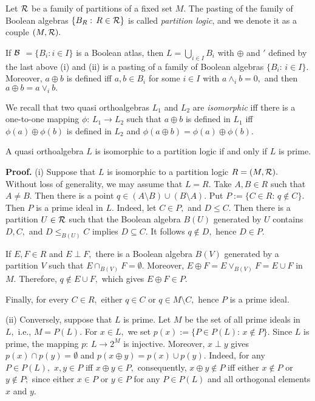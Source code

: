 Let $\cal R$ be a family of partitions of a fixed set  $M.$ The pasting
of the family of Boolean algebras $\{B_R:\, R \in {\cal {R}} \}$ is
called  {\it partition logic}, and we denote it as a couple
$(M, {\cal{R}}).$

\begin{remark} If $\cal {B}$ $ = \{B_i: i \in I\}$ is a Boolean atlas,
then $L = \bigcup_{i \in I} B_i$ with $\oplus$ and $'$ defined by
the last above {\rm (i)} and {\rm (ii)} is a pasting of a family of
Boolean algebras $\{B_i:\, i \in I\}.$
Moreover, $a \oplus b$ is defined iff $a,b \in B_i$ for some $i \in I$
with $a \wedge_i b = 0,$ and then $ a\oplus b = a \vee_i b.$
\end{remark}

We %
 recall that two quasi orthoalgebras $L_1$  and $L_2$ are {\it
isomorphic}
iff there is a one-to-one mapping $\phi:\, L_1 \to L_2$ such that
$a\oplus  b$ is defined in $L_1 $ iff $\phi(a) \oplus \phi(b)$ is
defined in $L_2$ and $\phi(a\oplus b) =\phi(a) \oplus \phi(b).$


\begin{theorem}\label{th5.2} A quasi orthoalgebra $L$ is
isomorphic to a partition logic if and only if $L$ is prime.
\end{theorem}

{\bf Proof.} (i)  Suppose that $L$ is isomorphic to a partition logic
$R = (M,{\cal {R}}).$ Without loss of generality, we may assume that $L=R.$
Take $A,B \in R$ such that $A \ne B$.  Then there is a point
$q \in (A\setminus B) \cup (B\setminus A).$ Put $P:= \{C \in R:\,
q \not\in C\}.$ Then $P$ is a prime ideal in $L.$ Indeed, let $C
\in P,$ and $D\le C.$ Then there is a partition $U \in {\cal
{R}}$ such that the Boolean algebra $B(U)$ generated by $U$
contains $D,C,$ and $D \le_{B(U)} C$ implies $D \subseteq C.$
It follows $q \not\in D,$ hence $D \in P.$

If $E,F \in R$ and $E
\perp F,$ there is a Boolean algebra $B(V)$ generated by a
partition $V$ such that  $E \cap_{B(V)} F = \emptyset.$ Moreover,
$E \oplus F = E \vee_{B(V)} F = E \cup F$ in $M.$ Therefore, $q \not\in
E \cup F,$ which gives $E \oplus F \in P.$

Finally, for every $C \in R,$ either $q \in C$ or $q \in M\setminus C,$
hence $P$ is a prime ideal.

(ii) Conversely, suppose that $L$ is prime. Let $M$ be the set
of all prime ideals in $L,$ i.e., $M = P(L).$ For $x \in L,$ we set
$p(x) :=\{P \in P(L):\, x \not\in P\}.$ Since $L$ is prime, the mapping
$p:\, L \to 2^M$ is injective. Moreover, $ x \perp y$ gives $p(x)
\cap p(y) =\emptyset$ and
$p(x\oplus y) = p(x) \cup p(y).$ Indeed, for any $P \in P(L),$
$x,y \in P$ iff
$x \oplus y \in P,$ consequently, $x \oplus y \not\in P $ iff either
$x \not\in P$ or $y \not\in P;$ since either $ x\in P$ or $y\in P$ for
any $P \in P(L)$ and all orthogonal elements $x$ and $y.$

